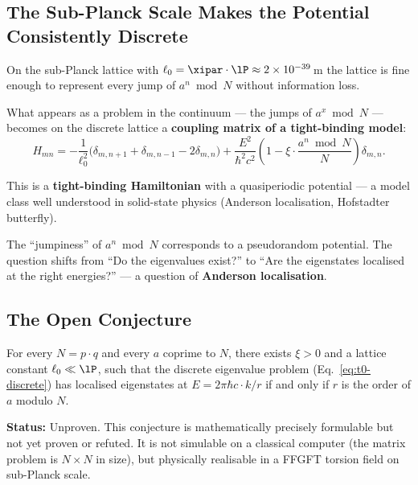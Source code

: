 \subsection{The Sub-Planck Scale Makes the Potential Consistently Discrete}

On the sub-Planck lattice with $\ell_0 = \xipar \cdot \lP \approx 2 \times 10^{-39}$\,m
the lattice is fine enough to represent every jump of
$a^n \bmod N$ without information loss.

\begin{foundation}
What appears as a problem in the continuum ---
the jumps of $a^x \bmod N$ ---
becomes on the discrete lattice a
\textbf{coupling matrix of a tight-binding model}:
\begin{equation}
  H_{mn} =
  -\frac{1}{\ell_0^2}
  \bigl(\delta_{m,n+1} + \delta_{m,n-1} - 2\delta_{m,n}\bigr)
  + \frac{E^2}{\hbar^2 c^2}
  \!\left(1 - \xi \cdot \frac{a^n \!\bmod N}{N}\right)
  \!\delta_{m,n}.
\end{equation}

This is a \textbf{tight-binding Hamiltonian}
with a quasiperiodic potential ---
a model class well understood in solid-state physics
(Anderson localisation, Hofstadter butterfly).

The ``jumpiness'' of $a^n \bmod N$ corresponds to
a pseudorandom potential.
The question shifts from
``Do the eigenvalues exist?''
to
``Are the eigenstates localised at the right energies?'' ---
a question of \textbf{Anderson localisation}.
\end{foundation}

\subsection{The Open Conjecture}
\label{sec:ffgft-conjecture}

\begin{keyresult}
For every $N = p \cdot q$ and every $a$
coprime to $N$, there exists $\xi > 0$
and a lattice constant $\ell_0 \ll \lP$,
such that the discrete eigenvalue problem
(Eq.~\ref{eq:t0-discrete})
has localised eigenstates
at $E = 2\pi\hbar c \cdot k/r$ if and only if
$r$ is the order of $a$ modulo $N$.

\medskip
\textbf{Status:} Unproven.
This conjecture is mathematically precisely formulable
but not yet proven or refuted.
It is not simulable on a classical computer
(the matrix problem is $N \times N$ in size),
but physically realisable in a
FFGFT torsion field on sub-Planck scale.
\end{keyresult}

